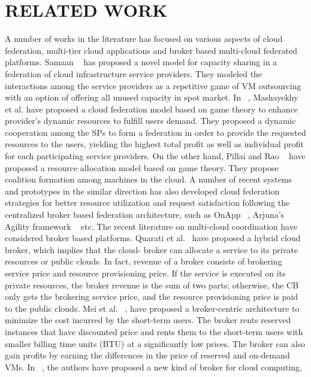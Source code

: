 \documentclass[conference]{IEEEtran}
\newcommand\tab[1][0.8cm]{\hspace*{#1}}
\begin{document}
\section{RELATED WORK}
\tab A number of works in the literature has focused on various
aspects of cloud federation, multi-tier cloud applications and
broker based multi-cloud federated platforms. Samaan ~\cite{b5} has
proposed a novel model for capacity sharing in a federation
of cloud infrastructure service providers. They modeled the
interactions among the service providers as a repetitive game
of VM outsourcing with an option of offering all unused
capacity in spot market. In ~\cite{b3}, Mashayekhy et al. have
proposed a cloud federation model based on game theory to
enhance provider’s dynamic resources to fulfill users demand.
They proposed a dynamic cooperation among the SPs to form
a federation in order to provide the requested resources to the
users, yielding the highest total profit as well as individual
profit for each participating service providers. On the other
hand, Pillai and Rao ~\cite{b6} have proposed a resource allocation
model based on game theory. They propose coalition formation
among machines in the cloud. A number of recent systems and
prototypes in the similar direction has also developed cloud
federation strategies for better resource utilization and request
satisfaction following the centralized broker based federation
architecture, such as OnApp ~\cite{b1}, Arjuna’s Agility framework
~\cite{b8} etc.
\newline
\tab The recent literature on multi-cloud coordination have
considered broker based platforms. Quarati et al.~\cite{b10} have
proposed a hybrid cloud broker, which implies that the cloud-
broker can allocate a service to its private resources or public
clouds. In fact, revenue of a broker consists of brokering
service price and resource provisioning price. If the service
is executed on its private resources, the broker revenue is the
sum of two parts; otherwise, the CB only gets the brokering
service price, and the resource provisioning price is paid to the
public clouds. Mei et al. ~\cite{b8}, have proposed a broker-centric
architecture to minimize the cost incurred by the short-term
users. The broker rents reserved instances that have discounted
price and rents them to the short-term users with smaller
billing time units (BTU) at a significantly low prices. The
broker can also gain profits by earning the differences in the
price of reserved and on-demand VMs. In ~\cite{b9}, the authors
have proposed a new kind of broker for cloud computing,
\end{document}
